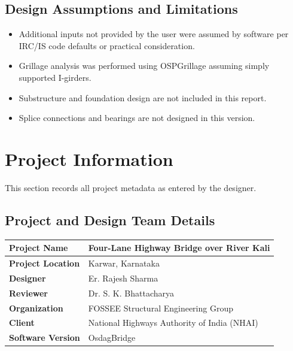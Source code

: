 \documentclass[12pt,a4paper]{report}
\numberwithin{table}{chapter}
\numberwithin{figure}{chapter}
\begin{document}
\section*{Design Assumptions and Limitations}
\label{sec:assumptions}

\begin{itemize}
\item Additional inputs not provided by the user were assumed by software per IRC/IS code defaults or practical consideration.
\item Grillage analysis was performed using OSPGrillage assuming simply supported I-girders.
\item Substructure and foundation design are not included in this report.
\item Splice connections and bearings are not designed in this version.
\end{itemize}

\titleformat{\chapter}[block]{\normalfont\Large\bfseries\centering}{\thechapter}{1em}{}
\titlespacing*{\chapter}{0pt}{-30pt}{10pt}


\chapter{Project Information}

This section records all project metadata as entered by the designer.

\section{Project and Design Team Details}
\label{sec:project-details}

\begin{tabular}{|L{5.5cm}|L{8.5cm}|}
\hline
\textbf{Project Name} & Four-Lane Highway Bridge over River Kali \\
\hline
\textbf{Project Location} & Karwar, Karnataka \\
\hline
\textbf{Designer} & Er. Rajesh Sharma \\
\hline
\textbf{Reviewer} & Dr. S. K. Bhattacharya \\
\hline
\textbf{Organization} & FOSSEE Structural Engineering Group \\
\hline
\textbf{Client} & National Highways Authority of India (NHAI) \\
\hline
\textbf{Software Version} & OsdagBridge \\
\hline
\end{tabular}
\end{document}
